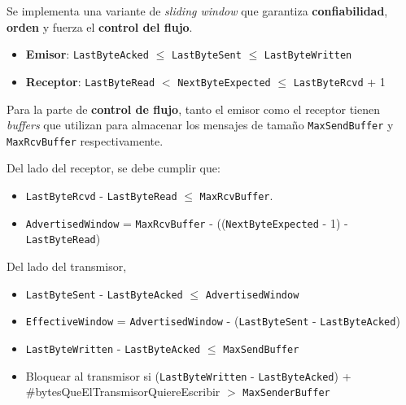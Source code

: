 \documentclass[]{article}
\begin{document}


Se implementa una variante de \emph{sliding window} que garantiza \textbf{confiabilidad}, \textbf{orden} y fuerza el \textbf{control del flujo}.

\begin{itemize}
    \item \textbf{Emisor}: \texttt{LastByteAcked} $\leq$ \texttt{LastByteSent} $\leq$ \texttt{LastByteWritten}
    \item \textbf{Receptor}: \texttt{LastByteRead} $ < $ \texttt{NextByteExpected} $\leq$ \texttt{LastByteRcvd} + 1
\end{itemize}


Para la parte de \textbf{control de flujo}, tanto el emisor como el receptor tienen \emph{buffers} que utilizan para almacenar los mensajes de tamaño \texttt{MaxSendBuffer} y \texttt{MaxRcvBuffer} respectivamente.

Del lado del receptor, se debe cumplir que:
\begin{itemize}
    \item \texttt{LastByteRcvd} - \texttt{LastByteRead} $\leq$ \texttt{MaxRcvBuffer}.
    \item \texttt{AdvertisedWindow} = \texttt{MaxRcvBuffer} - ((\texttt{NextByteExpected} - 1) - \texttt{LastByteRead})
\end{itemize}

Del lado del transmisor,
\begin{itemize}
    \item \texttt{LastByteSent} - \texttt{LastByteAcked} $\leq$ \texttt{AdvertisedWindow}
    \item \texttt{EffectiveWindow} = \texttt{AdvertisedWindow} - (\texttt{LastByteSent} - \texttt{LastByteAcked})
    \item \texttt{LastByteWritten} - \texttt{LastByteAcked} $\leq$ \texttt{MaxSendBuffer}
    \item Bloquear al transmisor si (\texttt{LastByteWritten} - \texttt{LastByteAcked}) + \#bytesQueElTransmisorQuiereEscribir $>$ \texttt{MaxSenderBuffer}
\end{itemize}

\end{document}
